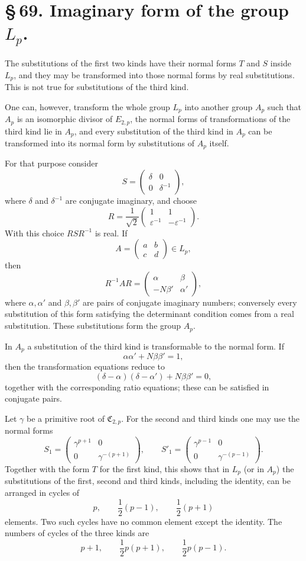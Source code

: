 \documentclass[11pt]{article}
\providecommand{\mat}[4]{\begin{pmatrix}#1&#2\\#3&#4\end{pmatrix}}
\providecommand{\mat}[4]{\begin{pmatrix}#1&#2\\#3&#4\end{pmatrix}}
\providecommand{\Cfield}{\mathfrak C}
\begin{document}
\section*{\S\,69. Imaginary form of the group $L_p$.}

The substitutions of the first two kinds have their normal forms $T$ and $S$ inside $L_p$, and they may be transformed into those normal forms by real substitutions. This is not true for substitutions of the third kind.

One can, however, transform the whole group $L_p$ into another group $A_p$ such that $A_p$ is an isomorphic divisor of $E_{2,p}$, the normal forms of transformations of the third kind lie in $A_p$, and every substitution of the third kind in $A_p$ can be transformed into its normal form by substitutions of $A_p$ itself.

For that purpose consider
\[
 S=\mat{\delta}{0}{0}{\delta^{-1}},
\]
where $\delta$ and $\delta^{-1}$ are conjugate imaginary, and choose
\begin{equation}
 R=\frac{1}{\sqrt2}\mat{1}{1}{\varepsilon^{-1}}{-\varepsilon^{-1}}.
 \tag{1}
\end{equation}
With this choice $RSR^{-1}$ is real. If
\[
 A=\mat{a}{b}{c}{d}\in L_p,
\]
then
\begin{equation}
 R^{-1}AR=
 \mat{\alpha}{\beta}{-N\beta'}{\alpha'},
 \tag{2}
\end{equation}
where $\alpha,\alpha'$ and $\beta,\beta'$ are pairs of conjugate imaginary numbers; conversely every substitution of this form satisfying the determinant condition comes from a real substitution. These substitutions form the group $A_p$.

In $A_p$ a substitution of the third kind is transformable to the normal form. If
\begin{equation}
 \alpha\alpha'+N\beta\beta'=1,
 \tag{3}
\end{equation}
then the transformation equations reduce to
\begin{equation}
 (\delta-\alpha)(\delta-\alpha')+N\beta\beta'=0,
 \tag{4}
\end{equation}
together with the corresponding ratio equations; these can be satisfied in conjugate pairs.

Let $\gamma$ be a primitive root of $\Cfield_{2,p}$. For the second and third kinds one may use the normal forms
\begin{equation}
 S_1=\mat{\gamma^{p+1}}{0}{0}{\gamma^{-(p+1)}},
 \qquad
 S'_1=\mat{\gamma^{p-1}}{0}{0}{\gamma^{-(p-1)}}.
 \tag{5}
\end{equation}
Together with the form $T$ for the first kind, this shows that in $L_p$ (or in $A_p$) the substitutions of the first, second and third kinds, including the identity, can be arranged in cycles of
\[
 p,
 \qquad \frac12(p-1),
 \qquad \frac12(p+1)
\]
elements. Two such cycles have no common element except the identity. The numbers of cycles of the three kinds are
\begin{equation}
 p+1,
 \qquad \frac12p(p+1),
 \qquad \frac12p(p-1).
 \tag{6}
\end{equation}
\end{document}
